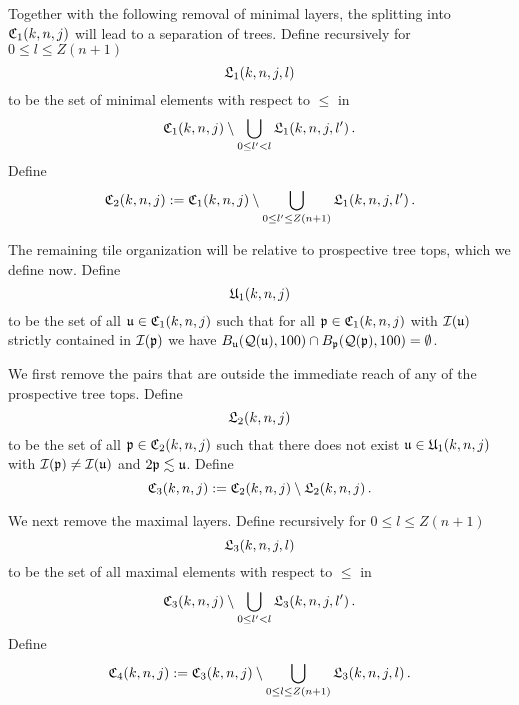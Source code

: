 {\begin{equation}
\end{equation}
Together with the following removal of minimal layers, the splitting into ${\mathfrak C}_1(k,n,j)$ will lead to a separation of  trees.
Define recursively for $0\le l\le Z(n+1)$
\begin{equation}
    \label{eq-L1-def}
    {\mathfrak L}_1(k,n,j,l)
\end{equation}
to be the set of minimal elements with respect to $\le$ in
\begin{equation}
    {\mathfrak C}_1(k,n,j)\setminus \bigcup_{0\le l'<l}
{\mathfrak L}_1(k,n,j,l')\, .
\end{equation}
Define
\begin{equation}
    \label{eq-C2-def}
    {\mathfrak C}_2(k,n,j):= {\mathfrak C}_1(k,n,j)\setminus \bigcup_{0\le l'\le Z(n+1)}
{\mathfrak L}_1(k,n,j,l')\, .
\end{equation}

The remaining tile organization will be relative to
prospective tree tops, which we define now.
Define
\begin{equation}\label{defunkj}
     {\mathfrak U}_1(k,n,j)
\end{equation}
to be the set of all
${\mathfrak u} \in {\mathfrak C}_1(k,n,j)$ such that
for all ${\mathfrak p} \in {\mathfrak C}_1(k,n,j)$
with  ${\mathcal{I}}({\mathfrak u})$ strictly contained in
${\mathcal{I}}({\mathfrak p})$ we have $B_{{\mathfrak u}}({\mathcal{Q}}({\mathfrak u}), 100) \cap B_{{\mathfrak p}}({\mathcal{Q}}({\mathfrak p}),100) = \emptyset$.

We first remove the pairs that are outside the immediate reach of any of the prospective tree tops.
Define
\begin{equation}
\label{eq-L2-def}
{\mathfrak L}_2(k,n,j)
\end{equation}
to be the set of all ${\mathfrak p}\in {\mathfrak C}_2(k,n,j)$ such that there
does not exist
${\mathfrak u}\in {\mathfrak U}_1(k,n,j)$
with ${\mathcal{I}}({\mathfrak p})\neq {\mathcal{I}}({\mathfrak u})$ and $2{\mathfrak p}\lesssim {\mathfrak u}$.
Define
\begin{equation}
\label{eq-C3-def}
{\mathfrak C}_3(k,n,j):={\mathfrak C}_2(k,n,j)
  \setminus {\mathfrak L}_2(k,n,j)\, .
\end{equation}


We next remove the maximal layers.
Define recursively for $0 \le l \le Z(n+1)$
\begin{equation}
    \label{eq-L3-def}
    {\mathfrak L}_3(k,n,j,l)
\end{equation}
to be the set of all maximal elements with respect to $\le$ in
\begin{equation}
    {\mathfrak C}_3(k,n,j) \setminus \bigcup_{0 \le l' < l} {\mathfrak L}_3(k,n,j,l')\,.
\end{equation}
Define
\begin{equation}
\label{eq-C4-def}
{\mathfrak C}_4(k,n,j):={\mathfrak C}_3(k,n,j)
  \setminus \bigcup_{0 \le l \le Z(n+1)} {\mathfrak L}_3(k,n,j,l)\,.
\end{equation}

}
